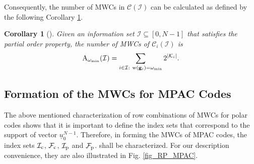 \documentclass[12pt, draftclsnofoot, peerreview, onecolumn]{IEEEtran}
\makeatletter
\theoremstyle{noparent}
\newtheorem{corollary}[theorem]{\textbf{Corollary}}
\renewenvironment{proof}[1][\proofname]{\par
  \pushQED{\qed}
  \normalfont \topsep6\p@\@plus6\p@\relax
  \trivlist
  \item[\hskip\labelsep
        \itshape
    #1\@addpunct{:}]\ignorespaces
}{
  \popQED\endtrivlist\@endpefalse
}
\makeatother
\begin{document}
Consequently, the number of MWCs in  
$\mathcal{C}(\mathcal{I})$ can be calculated as defined by 
the following Corollary \ref{corollary_MWC_number_polar}.


\begin{corollary}[\cite{Rowshan2023FormationMinweight}]
    \label{corollary_MWC_number_polar}
    Given an information set $\mathcal{I} \subseteq [0,N-1]$ that satisfies the partial order property, 
    the number of MWCs of $\mathcal{C}_i(\mathcal{I})$ is 
    \begin{equation}
    \label{polar_MWC_number}
    {\rm A}_{\omega_{\min}}(\mathcal{I})=\sum_{i \in \mathcal{I}:\ {\rm w}({\bf g}_i)=\omega_{\min}} 2^{\left|\mathcal{K}_{i}\right|}. 
    \end{equation} 
\end{corollary}

\subsection{Formation of the MWCs for MPAC Codes}
\label{sec5A}

The above mentioned characterization of row combinations of 
MWCs for polar codes shows that it is important to define the index sets that correspond to 
the support of vector $\underline{u}_0^{N-1}$.
Therefore, in forming the MWCs of MPAC codes, the index sets $\mathcal{I}_{\rm c}$, 
$\mathcal{F}_{\rm c}$, $\mathcal{I}_{\rm p}$ and $\mathcal{F}_{\rm p}$. 
shall be characterized.
For our description convenience, they are also illustrated in Fig. \ref{fig_RP_MPAC}.
\end{document}
